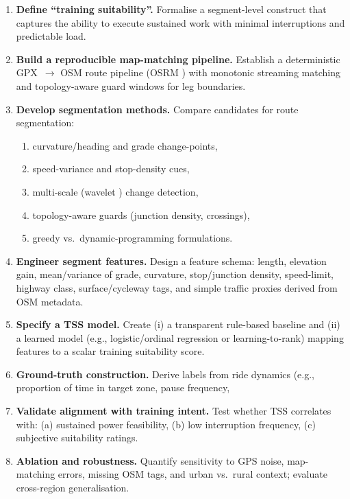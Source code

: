 \documentclass[11pt,twoside]{report}
\begin{document}
\begin{enumerate}[label=O\arabic*., leftmargin=2.2em]
	\item \textbf{Define ``training suitability''.} Formalise a segment-level construct that captures the ability to execute sustained work with minimal interruptions and predictable load.
	\item \textbf{Build a reproducible map-matching pipeline.} Establish a deterministic GPX~$\rightarrow$ OSM route pipeline (OSRM \citep{Luxen2011}) with monotonic streaming matching and topology-aware guard windows for leg boundaries.
	\item \textbf{Develop segmentation methods.} Compare candidates for route segmentation:
	      \begin{enumerate}[label=O3\alph*., leftmargin=2.5em]
		      \item curvature/heading and grade change-points,
		      \item speed-variance and stop-density cues,
		      \item multi-scale (wavelet \citep{Sharifzadeh2005}) change detection,
		      \item topology-aware guards (junction density, crossings),
		      \item greedy vs.\ dynamic-programming formulations.
	      \end{enumerate}
	\item \textbf{Engineer segment features.} Design a feature schema: length, elevation gain, mean/variance of grade, curvature, stop/junction density, speed-limit, highway class, surface/cycleway tags, and simple traffic proxies derived from OSM metadata.
	\item \textbf{Specify a TSS model.} Create (i) a transparent rule-based baseline and (ii) a learned model (e.g., logistic/ordinal regression or learning-to-rank) mapping features to a scalar training suitability score.
	\item \textbf{Ground-truth construction.} Derive labels from ride dynamics (e.g., proportion of time in target zone, pause frequency, %
	\item \textbf{Validate alignment with training intent.} Test whether TSS correlates with: (a) sustained power feasibility, (b) low interruption frequency, (c) subjective suitability ratings.
	\item \textbf{Ablation and robustness.} Quantify sensitivity to GPS noise, map-matching errors, missing OSM tags, and urban vs.\ rural context; evaluate cross-region generalisation.

\end{enumerate}
\end{document}
